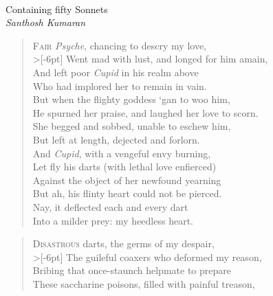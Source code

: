 \documentclass[a5paper, 12pt, oneside]{memoir}
\begin{document}
\begin{titlingpage}
\null  %
\nointerlineskip  %
\vfill
\let\snewpage \newpage
\let\newpage \relax

\centering
{\HUGE {}} \\[5pt]
{\Large Containing fifty Sonnets} \\[10pt]
{\Large\itshape Santhosh Kumaran}

\let \newpage \snewpage
\vfill 
\break %
\end{titlingpage}

\PoemTitle{}
\begin{verse}
    \lettrine{F}{air} \textit{Psyche}, chancing to descry my love, \\>[-6pt]
    Went mad with lust, and longed for him amain, \\
    And left poor \textit{Cupid} in his realm above \\
    Who had implored her to remain in vain. \\
    But when the flighty goddess `gan to woo him, \\
    He spurned her praise, and laughed her love to scorn. \\
    She begged and sobbed, unable to eschew him, \\
    But left at length, dejected and forlorn. \\
    And \textit{Cupid}, with a vengeful envy burning, \\
    Let fly his darts (with lethal love enfierced) \\
    Against the object of her newfound yearning \\
    But ah, his flinty heart could not be pierced. \\
    \vin Nay, it deflected each and every dart \\
    \vin Into a milder prey: my heedless heart.
\end{verse}

\PoemTitle{}
\begin{verse}
    \lettrine{D}{isastrous} darts, the germs of my despair, \\>[-6pt]
    The guileful coaxers who deformed my reason, \\
    Bribing that once-staunch helpmate to prepare \\
    These saccharine poisons, filled with painful treason, \\
\end{verse}
\end{document}
